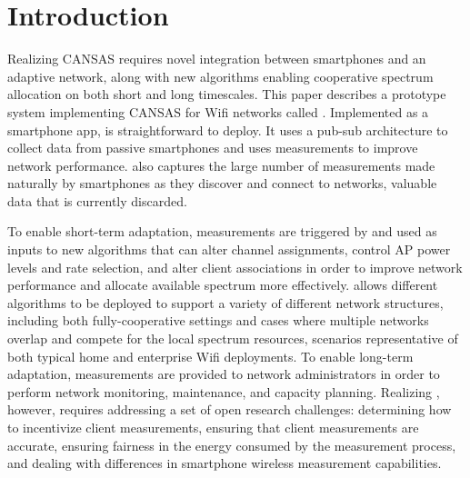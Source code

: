 \section{Introduction}


Realizing CANSAS requires novel integration between smartphones and an
adaptive network, along with new algorithms enabling cooperative spectrum
allocation on both short and long timescales. This paper describes a
prototype system implementing CANSAS for Wifi networks called \PS{}.
Implemented as a smartphone app, \PS{} is straightforward to deploy. It uses
a pub-sub architecture to collect data from passive smartphones and uses
measurements to improve network performance. \PS{} also captures the large
number of measurements made naturally by smartphones as they discover and
connect to networks, valuable data that is currently discarded.

To enable short-term adaptation, measurements are triggered by and used as
inputs to new algorithms that can alter channel assignments, control AP power
levels and rate selection, and alter client associations in order to improve
network performance and allocate available spectrum more effectively. \PS{}
allows different algorithms to be deployed to support a variety of different
network structures, including both fully-cooperative settings and cases where
multiple networks overlap and compete for the local spectrum resources,
scenarios representative of both typical home and enterprise Wifi
deployments. To enable long-term adaptation, measurements are provided to
network administrators in order to perform network monitoring, maintenance,
and capacity planning. Realizing \PS{}, however, requires addressing a set of
open research challenges: determining how to incentivize client measurements,
ensuring that client measurements are accurate, ensuring fairness in the
energy consumed by the measurement process, and dealing with differences in
smartphone wireless measurement capabilities.

